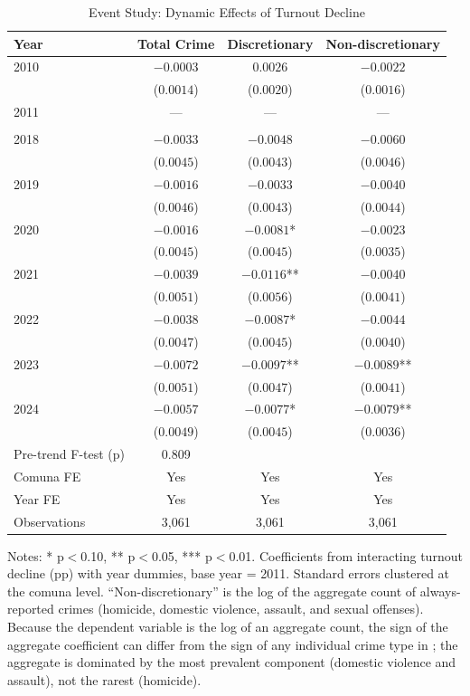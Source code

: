 \begin{table}[H]
\centering
\caption{Event Study: Dynamic Effects of Turnout Decline}
\begin{threeparttable}
\begin{tabular}{lccc}
\toprule
Year & Total Crime & Discretionary & Non-discretionary \\
\midrule
2010 & $-0.0003$ & $0.0026$ & $-0.0022$ \\
   & ($0.0014$) & ($0.0020$) & ($0.0016$) \\
2011 & --- & --- & --- \\
   &  &  &  \\
2018 & $-0.0033$ & $-0.0048$ & $-0.0060$ \\
   & ($0.0045$) & ($0.0043$) & ($0.0046$) \\
2019 & $-0.0016$ & $-0.0033$ & $-0.0040$ \\
   & ($0.0046$) & ($0.0043$) & ($0.0044$) \\
2020 & $-0.0016$ & $-0.0081$* & $-0.0023$ \\
   & ($0.0045$) & ($0.0045$) & ($0.0035$) \\
2021 & $-0.0039$ & $-0.0116$** & $-0.0040$ \\
   & ($0.0051$) & ($0.0056$) & ($0.0041$) \\
2022 & $-0.0038$ & $-0.0087$* & $-0.0044$ \\
   & ($0.0047$) & ($0.0045$) & ($0.0040$) \\
2023 & $-0.0072$ & $-0.0097$** & $-0.0089$** \\
   & ($0.0051$) & ($0.0047$) & ($0.0041$) \\
2024 & $-0.0057$ & $-0.0077$* & $-0.0079$** \\
   & ($0.0049$) & ($0.0045$) & ($0.0036$) \\
\midrule
Pre-trend F-test (p) & 0.809 & & \\
Comuna FE & Yes & Yes & Yes \\
Year FE & Yes & Yes & Yes \\
Observations & 3,061 & 3,061 & 3,061 \\
\bottomrule
\end{tabular}
\begin{tablenotes}[flushleft]
\small
\item Notes: * p$<$0.10, ** p$<$0.05, *** p$<$0.01. Coefficients from interacting turnout decline (pp) with year dummies, base year = 2011. Standard errors clustered at the comuna level. ``Non-discretionary'' is the log of the aggregate count of always-reported crimes (homicide, domestic violence, assault, and sexual offenses). Because the dependent variable is the log of an aggregate count, the sign of the aggregate coefficient can differ from the sign of any individual crime type in ; the aggregate is dominated by the most prevalent component (domestic violence and assault), not the rarest (homicide).
\end{tablenotes}
\end{threeparttable}
\label{tab:event_study}
\end{table}
